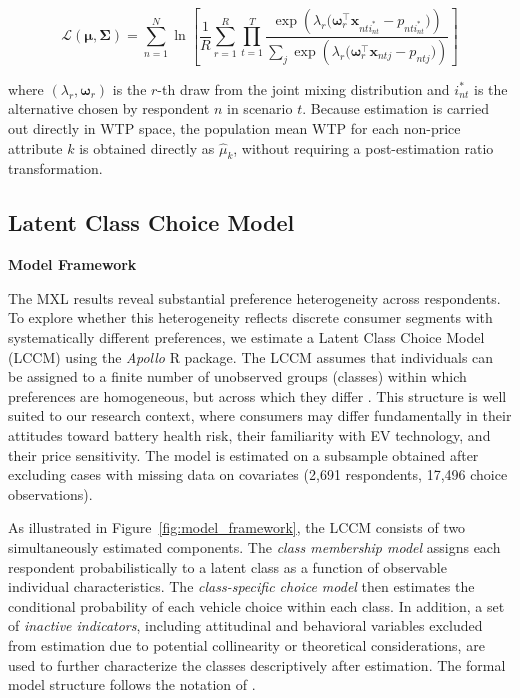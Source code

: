 \documentclass[a4paper,fleqn]{cas-sc}   %
\begin{document}
\begin{equation}
    \mathcal{L}(\boldsymbol{\mu}, \boldsymbol{\Sigma}) = \sum_{n=1}^{N} \ln \left[ \frac{1}{R} \sum_{r=1}^{R} \prod_{t=1}^{T} \frac{\exp\!\left(\lambda_r\bigl(\boldsymbol{\omega}_r^{\top}\mathbf{x}_{nti_{nt}^*} - p_{nti_{nt}^*}\bigr)\right)}{\displaystyle\sum_{j} \exp\!\left(\lambda_r\bigl(\boldsymbol{\omega}_r^{\top}\mathbf{x}_{ntj} - p_{ntj}\bigr)\right)} \right]
    \label{eq:mxl_ll}
\end{equation}

\noindent where $(\lambda_r, \boldsymbol{\omega}_r)$ is the $r$-th draw from the joint mixing distribution and $i_{nt}^*$ is the alternative chosen by respondent $n$ in scenario $t$. Because estimation is carried out directly in WTP space, the population mean WTP for each non-price attribute $k$ is obtained directly as $\hat{\mu}_k$, without requiring a post-estimation ratio transformation.



\subsection{Latent Class Choice Model}
\vspace{\baselineskip}
\noindent \textbf{Model Framework} \par

The MXL results reveal substantial preference heterogeneity across respondents. To explore whether this heterogeneity reflects discrete consumer segments with systematically different preferences, we estimate a Latent Class Choice Model (LCCM) using the \textit{Apollo} R package. The LCCM assumes that individuals can be assigned to a finite number of unobserved groups (classes) within which preferences are homogeneous, but across which they differ \parencite{kamakuraProbabilisticChoiceModel1989, greeneLatentClassModel2003}. This structure is well suited to our research context, where consumers may differ fundamentally in their attitudes toward battery health risk, their familiarity with EV technology, and their price sensitivity. The model is estimated on a subsample obtained after excluding cases with missing data on covariates (2,691 respondents, 17,496 choice observations).

As illustrated in Figure~\ref{fig:model_framework}, the LCCM consists of two simultaneously estimated components. The \textit{class membership model} assigns each respondent probabilistically to a latent class as a function of observable individual characteristics. The \textit{class-specific choice model} then estimates the conditional probability of each vehicle choice within each class. In addition, a set of \textit{inactive indicators}, including attitudinal and behavioral variables excluded from estimation due to potential collinearity or theoretical considerations, are used to further characterize the classes descriptively after estimation. The formal model structure follows the notation of \textcite{chenExploringTouristPreference2023}.
\end{document}
